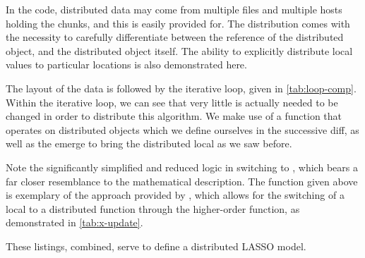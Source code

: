 In the \lsr{} code, distributed data may come from multiple files and multiple hosts holding the chunks, and this is easily provided for.
The distribution comes with the necessity to carefully differentiate between the reference of the distributed object, and the distributed object itself.
The ability to explicitly distribute local values to particular locations is also demonstrated here.


The layout of the data is followed by the iterative loop, given in \cref{tab:loop-comp}.
Within the iterative loop, we can see that very little is actually needed to be changed in order to distribute this algorithm.
We make use of a function that operates on distributed objects which we define ourselves in the successive diff, as well as the emerge to bring the distributed local as we saw before.


Note the significantly simplified and reduced logic in switching to \lsr{}, which bears a far closer resemblance to the mathematical description.
The  function given above is exemplary of the approach provided by \lsr{}, which allows for the switching of a local to a distributed function through the higher-order  function, as demonstrated in \cref{tab:x-update}.


These listings, combined, serve to define a distributed LASSO model.
